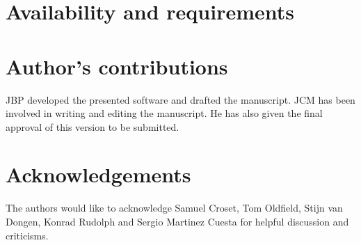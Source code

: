 \documentclass[10pt]{bmc_article}
\newenvironment{bmcformat}{\baselineskip20pt\sloppy\setboolean{publ}{false}}{\baselineskip20pt\sloppy}
\begin{document}
\begin{bmcformat}
\section{Availability and requirements}





\bigskip

\section*{Author's contributions}
JBP developed the presented software and drafted the manuscript. JCM has been involved in writing and editing the manuscript. He has also given the final approval of this version to be submitted.

    

\section*{Acknowledgements}
The authors would like to acknowledge Samuel Croset, Tom Oldfield, Stijn van Dongen, Konrad Rudolph and Sergio Martinez Cuesta for helpful discussion and criticisms.
 

\newpage
{
   }     %



\end{bmcformat}
\end{document}
